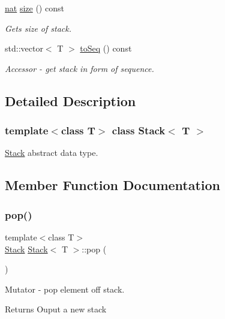\begin{DoxyCompactItemize}
\hyperlink{_card_types_8h_a56638ee9d162e8cce3a15f92d2023d6e}{nat} \hyperlink{class_stack_ab9892502a02b845f92ef0c631270f1df}{size} () const
\begin{DoxyCompactList}\small\item\em Gets size of stack. \end{DoxyCompactList}\item 
std\+::vector$<$ T $>$ \hyperlink{class_stack_af96a1f465756ae90dec75ae76e1d301d}{to\+Seq} () const
\begin{DoxyCompactList}\small\item\em Accessor -\/ get stack in form of sequence. \end{DoxyCompactList}\end{DoxyCompactItemize}


\subsection{Detailed Description}
\subsubsection*{template$<$class T$>$\newline
class Stack$<$ T $>$}

\hyperlink{class_stack}{Stack} abstract data type. 

\subsection{Member Function Documentation}
\mbox{\label{class_stack_a0682e08ce3a10b12697dfd828a83268f}} 
\subsubsection{\texorpdfstring{pop()}{pop()}}
{\footnotesize\ttfamily template$<$class T$>$ \\
\hyperlink{class_stack}{Stack} \hyperlink{class_stack}{Stack}$<$ T $>$\+::pop (\begin{DoxyParamCaption}{ }\end{DoxyParamCaption})}



Mutator -\/ pop element off stack. 

\begin{DoxyReturn}{Returns}
Ouput a new stack 
\end{DoxyReturn}
\mbox{\label{class_stack_a4c6a61ccc7c974b889240299599be078}} 
